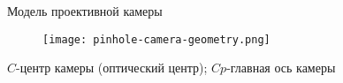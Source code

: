 
\begin{frame}{Модель проективной камеры}
\begin{figure}
\centering
\texttt{[image: pinhole-camera-geometry.png]}
\end{figure}
\textbf{$C$}-центр камеры (оптический центр); \textbf{$Cp$}-главная ось камеры
\end{frame}